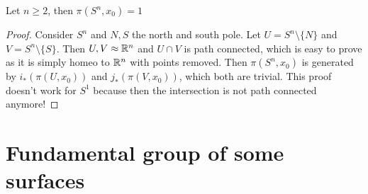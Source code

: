 \begin{corollary}
    Let $n \ge  2$, then $\pi(S^n, x_0) = 1$
\end{corollary}
\begin{proof}
    Consider $S^n$ and $N, S$ the north and south pole.
    Let $U = S^n \setminus \{N\} $ and $V = S^n \setminus \{S\}$.
    Then $U, V \approx \mathbb{R}^n$ and $U \cap V$ is path connected, which is easy to prove as it is simply homeo to $\mathbb{R}^n$ with points removed.
    Then $\pi(S^n, x_0)$ is generated by $i_*(\pi(U, x_0))$ and $j_*(\pi(V, x_0))$, which both are trivial.
    This proof doesn't work for $S^1$ because then the intersection is not path connected anymore!
\end{proof}

\section{Fundamental group of some surfaces}

